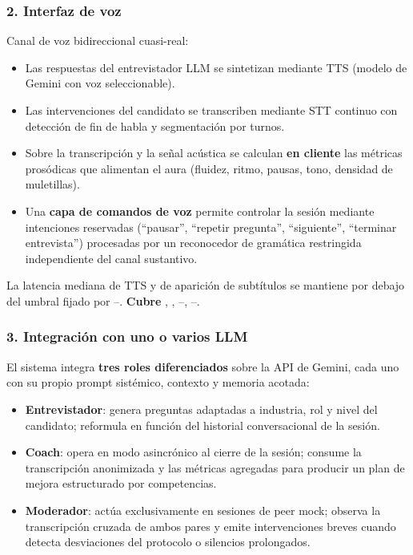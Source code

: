 \subsubsection{2. Interfaz de voz}
Canal de voz bidireccional cuasi-real:

\begin{itemize}
  \item Las respuestas del entrevistador LLM se sintetizan mediante TTS
        (modelo de Gemini con voz seleccionable).
  \item Las intervenciones del candidato se transcriben mediante STT
        continuo con detección de fin de habla y segmentación por
        turnos.
  \item Sobre la transcripción y la señal acústica se calculan
        \textbf{en cliente} las métricas prosódicas que alimentan el
        aura (fluidez, ritmo, pausas, tono, densidad de muletillas).
  \item Una \textbf{capa de comandos de voz} permite controlar la
        sesión mediante intenciones reservadas (``pausar'',
        ``repetir pregunta'', ``siguiente'', ``terminar entrevista'')
        procesadas por un reconocedor de gramática restringida
        independiente del canal sustantivo.
\end{itemize}

\noindent La latencia mediana de TTS y de aparición de subtítulos se
mantiene por debajo del umbral fijado por --.
\textbf{Cubre} , , --, --.

\subsubsection{3. Integración con uno o varios LLM}
El sistema integra \textbf{tres roles diferenciados} sobre la API de
Gemini, cada uno con su propio prompt sistémico, contexto y memoria
acotada:

\begin{itemize}
  \item \textbf{Entrevistador}: genera preguntas adaptadas a industria,
        rol y nivel del candidato; reformula en función del historial
        conversacional de la sesión.
  \item \textbf{Coach}: opera en modo asincrónico al cierre de la
        sesión; consume la transcripción anonimizada y las métricas
        agregadas para producir un plan de mejora estructurado por
        competencias.
  \item \textbf{Moderador}: actúa exclusivamente en sesiones de peer
        mock; observa la transcripción cruzada de ambos pares y emite
        intervenciones breves cuando detecta desviaciones del
        protocolo o silencios prolongados.
\end{itemize}

